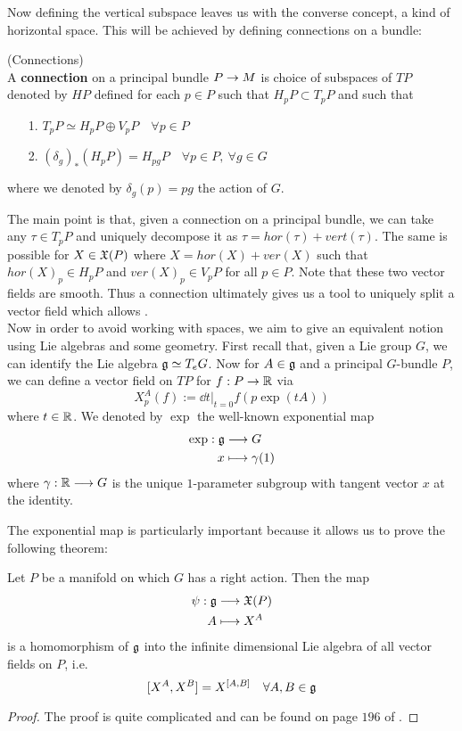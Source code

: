 Now defining the vertical subspace leaves us with the converse concept, a kind of horizontal space. This will be achieved by defining connections on a bundle:

\begin{definition}
\label{Connections}
(Connections)\\
  A \textbf{connection} on a principal bundle $P \rightarrow M$ is choice of subspaces of $TP$ denoted by $HP$ defined for each $p \in P$ such that $H_pP \subset T_pP$ and such that
  \begin{itemize}
    \item[1.] $T_pP \simeq H_pP \oplus V_pP \quad \forall p\in P$
    \item[2.] $(\delta_g)_* (H_pP) = H_{pg}P \quad \forall p \in P, \ \forall g \in G$
  \end{itemize}
  where we denoted by $\delta_g(p) = pg$ the action of $G$.
\end{definition}

The main point is that, given a connection on a principal bundle, we can take any $\tau \in T_pP$ and uniquely decompose it as $\tau = hor(\tau) + vert(\tau)$. The same is possible for $X\in \mathfrak{X}(P)$ where $X = hor(X) + ver(X)$ such that $hor(X)_p \in H_pP$ and $ver(X)_p \in V_pP$ for all $p\in P$. Note that these two vector fields are smooth. Thus a connection ultimately gives us a tool to uniquely split a vector field which allows .\\


Now in order to avoid working with spaces, we aim to give an equivalent notion using Lie algebras and some geometry. First recall that, given a Lie group $G$, we can identify the Lie algebra $\mathfrak{g} \simeq T_eG$. Now for $A \in \mathfrak{g}$ and a principal $G$-bundle $P$, we can define a vector field on $TP$ for $f:P\rightarrow \mathbb{R}$ via
$$ X^A_p(f) := \dd{}{t}\Big|_{t=0} f(p \exp(tA)) $$
where $t\in \mathbb{R}$. We denoted by $\exp$ the well-known exponential map
\begin{align}
  \exp: \mathfrak{g} &\longrightarrow G\\
  x &\longmapsto \gamma(1)
\end{align}
where $\gamma:\mathbb{R}\longrightarrow G$ is the unique $1$-parameter subgroup with tangent vector $x$ at the identity.

The exponential map is particularly important because it allows us to prove the following theorem:

\begin{theo}
  Let $P$ be a manifold on which $G$ has a right action. Then the map
  \begin{align}
    \psi : \mathfrak{g} &\longrightarrow \mathfrak{X}(P)\\
    A &\longmapsto X^A
  \end{align}
  is a homomorphism of $\mathfrak{g}$ into the infinite dimensional Lie algebra of all vector fields on $P$, i.e.
  $$ [X^A, X^B] = X^{[A,B]} \quad \forall A,B \in \mathfrak{g} $$
\begin{proof}
  The proof is quite complicated and can be found on page $196$ of .
\end{proof}
\end{theo}

